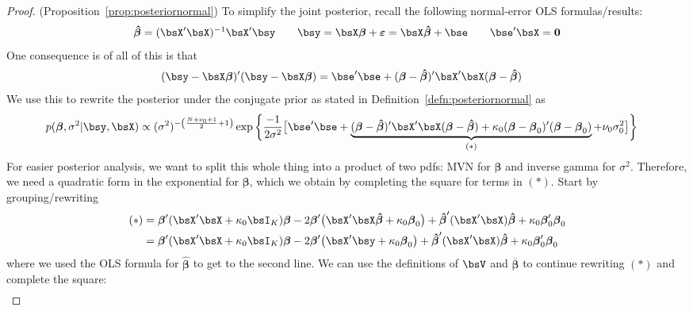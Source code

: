 \documentclass[12pt]{article}
\theoremstyle{plain}
\theoremstyle{definition}
\theoremstyle{remark}
\newcommand{\bsvarepsilon}{\boldsymbol{\varepsilon}}
\newcommand{\bsbeta}{\boldsymbol{\beta}}
\newcommand{\bshatbeta}{\boldsymbol{\hat{\beta}}}
\newcommand{\bsbarbeta}{\boldsymbol{\overline{\beta}}}
\renewcommand{\bso}{\boldsymbol{0}}
\begin{document}
\clearpage
\begin{proof}(Proposition~\ref{prop:posteriornormal})
To simplify the joint posterior, recall the following normal-error OLS
formulas/results:
\begin{align*}
  \bshatbeta=(\bsX'\bsX)^{-1}\bsX'\bsy
  \qquad
  \bsy
  = \bsX\bsbeta + \bsvarepsilon
  = \bsX\bshatbeta + \bse
  \qquad
  \bse'\bsX = \bso
\end{align*}
One consequence is of all of this is that
\begin{align*}
  (\bsy-\bsX\bsbeta)'
  (\bsy-\bsX\bsbeta)
  &=
  \bse'\bse
  + (\bsbeta-\bshatbeta)'\bsX'\bsX(\bsbeta-\bshatbeta)
\end{align*}
We use this to rewrite the posterior under the conjugate prior as stated
in Definition~\ref{defn:posteriornormal} as
\begin{align*}
  p(\bsbeta, \sigma^2 | \bsy,\bsX)
  &\propto
  (\sigma^2)^{-\left(\frac{N+\nu_0+1}{2}+1\right)}
  \exp\bigg\{%
    \frac{-1}{2\sigma^2}
    \big[
    \bse'\bse
    +
    \underbrace{
    (\bsbeta-\bshatbeta)'\bsX'\bsX(\bsbeta-\bshatbeta)
    + \kappa_0(\bsbeta-\bsbeta_0)'(\bsbeta-\bsbeta_0)
    }_{(*)}
    +\nu_0\sigma^2_0
    \big]
  \bigg\}
\end{align*}
For easier posterior analysis, we want to split this whole thing into a
product of two pdfs: MVN for $\bsbeta$ and inverse gamma for $\sigma^2$.
Therefore, we need a quadratic form in the exponential for $\bsbeta$,
which we obtain by completing the square for terms in $(*)$.  Start by
grouping/rewriting
\begin{align*}
  (*)
  &=
  \bsbeta'(\bsX'\bsX+\kappa_0\bsI_K)\bsbeta
  - 2\bsbeta'\big(\bsX'\bsX\bshatbeta + \kappa_0\bsbeta_0\big)
  + \bshatbeta'(\bsX'\bsX)\bshatbeta
  + \kappa_0 \bsbeta_0'\bsbeta_0
  \\
  &=
  \bsbeta'(\bsX'\bsX+\kappa_0\bsI_K)\bsbeta
  - 2\bsbeta'\big(\bsX'\bsy + \kappa_0\bsbeta_0\big)
  + \bshatbeta'(\bsX'\bsX)\bshatbeta
  + \kappa_0 \bsbeta_0'\bsbeta_0
\end{align*}
where we used the OLS formula for $\bshatbeta$ to get to the second
line.
We can use the definitions of $\bsV$ and $\bsbarbeta$ to continue
rewriting $(*)$ and complete the square:
\begin{align*}

\end{align*}
\end{proof}
\end{document}
